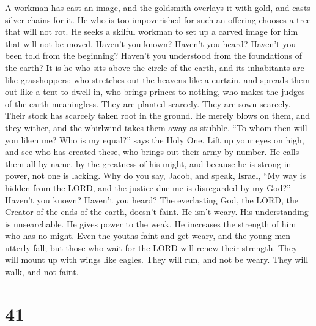  A workman has cast an image, and the goldsmith overlays
it with gold, and casts silver chains for it.  He who is
too impoverished for such an offering chooses a tree that will not rot.
He seeks a skilful workman to set up a carved image for him that will
not be moved.  Haven't you known? Haven't you heard?
Haven't you been told from the beginning? Haven't you understood from
the foundations of the earth?  It is he who sits above
the circle of the earth, and its inhabitants are like grasshoppers; who
stretches out the heavens like a curtain, and spreads them out like a
tent to dwell in,  who brings princes to nothing, who
makes the judges of the earth meaningless.  They are
planted scarcely. They are sown scarcely. Their stock has scarcely taken
root in the ground. He merely blows on them, and they wither, and the
whirlwind takes them away as stubble.  ``To whom then
will you liken me? Who is my equal?'' says the Holy One. 
Lift up your eyes on high, and see who has created these, who brings out
their army by number. He calls them all by name. by the greatness of his
might, and because he is strong in power, not one is lacking.
 Why do you say, Jacob, and speak, Israel, ``My way is
hidden from the LORD, and the justice due me is disregarded by my God?''
 Haven't you known? Haven't you heard? The everlasting
God, the LORD, the Creator of the ends of the earth, doesn't faint. He
isn't weary. His understanding is unsearchable.  He gives
power to the weak. He increases the strength of him who has no might.
 Even the youths faint and get weary, and the young men
utterly fall;  but those who wait for the LORD will renew
their strength. They will mount up with wings like eagles. They will
run, and not be weary. They will walk, and not faint.

\hypertarget{section-40}{%
\section{41}\label{section-40}}

